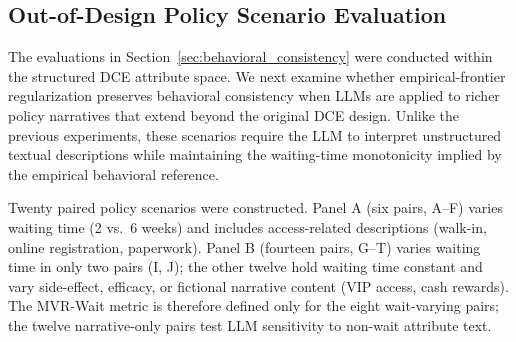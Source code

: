 \documentclass[11pt]{article}
\begin{document}
\clearpage
\subsection{Out-of-Design Policy Scenario Evaluation}
\label{sec:out_of_design}

The evaluations in Section~\ref{sec:behavioral_consistency} were conducted within the structured DCE attribute space. We next examine whether empirical-frontier regularization preserves behavioral consistency when LLMs are applied to richer policy narratives that extend beyond the original DCE design. Unlike the previous experiments, these scenarios require the LLM to interpret unstructured textual descriptions while maintaining the waiting-time monotonicity implied by the empirical behavioral reference.

Twenty paired policy scenarios were constructed. Panel A (six pairs, A--F) varies waiting time (2 vs.\ 6 weeks) and includes access-related descriptions (walk-in, online registration, paperwork). Panel B (fourteen pairs, G--T) varies waiting time in only two pairs (I, J); the other twelve hold waiting time constant and vary side-effect, efficacy, or fictional narrative content (VIP access, cash rewards). The MVR-Wait metric is therefore defined only for the eight wait-varying pairs; the twelve narrative-only pairs test LLM sensitivity to non-wait attribute text.
\end{document}
